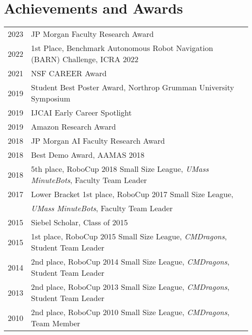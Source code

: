 \documentclass[Times]{article}
\begin{document}
\section*{Achievements and Awards}
\begin{tabular}{ p{1.2cm} l }
  2023  & JP Morgan Faculty Research Award \\
  2022  & 1st Place, Benchmark Autonomous Robot Navigation (BARN) Challenge,
          ICRA 2022 \\
  2021  & NSF CAREER Award\\
  2019  & Student Best Poster Award, Northrop Grumman University Symposium \\
  2019  & IJCAI Early Career Spotlight \\
  2019  & Amazon Research Award \\
  2018  & JP Morgan AI Faculty Research Award \\
  2018  & Best Demo Award, AAMAS 2018 \\
  2018  & 5th place, RoboCup 2018 Small Size League,
      \emph{UMass MinuteBots}, Faculty Team Leader\\
  2017  & Lower Bracket 1st place, RoboCup 2017 Small Size League, \\
      &\emph{UMass MinuteBots}, Faculty Team Leader\\
  2015  & Siebel Scholar, Class of 2015 \\
  2015  & 1st place, RoboCup 2015 Small Size League,
     \emph{CMDragons}, Student Team Leader\\
  2014  & 2nd place, RoboCup 2014 Small Size League,
     \emph{CMDragons}, Student Team Leader\\
  2013  & 2nd place, RoboCup 2013 Small Size League,
     \emph{CMDragons}, Student Team Leader\\
  2010  & 2nd place, RoboCup 2010 Small Size League,
     \emph{CMDragons}, Team Member\\
\end{tabular}



%
\end{document}
